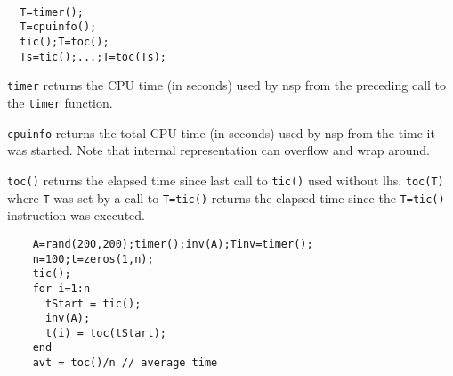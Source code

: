 \begin{mandesc}
   \\
    \\ 
   \\
\end{mandesc}
\begin{calling_sequence}
\begin{verbatim}
  T=timer();
  T=cpuinfo();
  tic();T=toc();
  Ts=tic();...;T=toc(Ts);
\end{verbatim}
\end{calling_sequence}
\begin{mandescription}
\noindent\verb!timer!  returns the CPU time (in seconds) used by nsp from the 
  preceding call to the \verb!timer! function. 

\noindent\verb!cpuinfo! returns the total CPU time (in seconds) used by nsp 
  from the time it was started. Note that internal representation
  can overflow and wrap around.

\noindent\verb!toc()! returns the elapsed time since last call to \verb!tic()!
  used without lhs. \verb!toc(T)! where \verb!T! was set by a call to 
  \verb!T=tic()! returns the elapsed time since the \verb!T=tic()! 
  instruction was executed. 
\end{mandescription}
\begin{examples}
  \begin{Verbatim}
    A=rand(200,200);timer();inv(A);Tinv=timer();
    n=100;t=zeros(1,n);
    tic();
    for i=1:n 
      tStart = tic();
      inv(A);
      t(i) = toc(tStart);
    end
    avt = toc()/n // average time 
  \end{Verbatim}
\end{examples}

